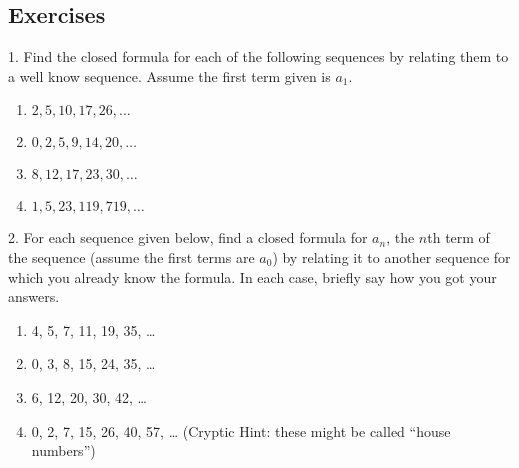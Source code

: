 \documentclass[10pt,]{book}
\theoremstyle{plain}
\theoremstyle{definition}
\numberwithin{equation}{chapter}
\begin{document}
\subsection[Exercises]{Exercises}\label{exercises_seq_basics}
\begin{exerciselist}
\item[1.]\hypertarget{exercise-140}{}
          Find the closed formula for each of the following sequences by relating them to a well know sequence. Assume the first term given is \(a_1\).
\leavevmode%
\begin{enumerate}[label=(\alph*)]
\item\hypertarget{li-483}{}\(2, 5, 10, 17, 26, \ldots\)%
\item\hypertarget{li-484}{}\(0, 2, 5, 9, 14, 20, \ldots\)%
\item\hypertarget{li-485}{}\(8, 12, 17, 23, 30,\ldots\)%
\item\hypertarget{li-486}{}\(1, 5, 23, 119, 719,\ldots\)%
\end{enumerate}
\par\smallskip
\item[2.]\hypertarget{exercise-141}{}
          For each sequence given below, find a closed formula for \(a_n\), the \(n\)th term of the sequence (assume the first terms are \(a_0\)) by relating it to another sequence for which you already know the formula. In each case, briefly say how you got your answers.
\leavevmode%
\begin{enumerate}[label=(\alph*)]
\item\hypertarget{li-491}{}
              4, 5, 7, 11, 19, 35, \dots{}


\item\hypertarget{li-492}{}
              0, 3, 8, 15, 24, 35, \dots{}


\item\hypertarget{li-493}{}
              6, 12, 20, 30, 42, \dots{}


\item\hypertarget{li-494}{}
              0, 2, 7, 15, 26, 40, 57, \dots{} (Cryptic Hint: these might be called ``house numbers'')



\end{enumerate}
\end{exerciselist}
\end{document}
